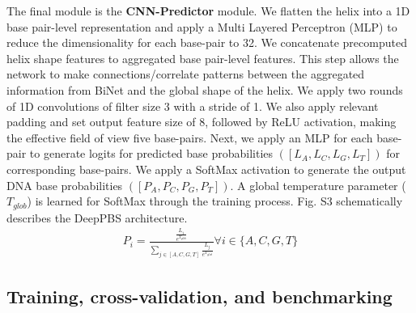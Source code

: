 The final module is the \textbf{CNN-Predictor} module. We flatten the helix into a 1D base pair-level representation and apply a Multi Layered Perceptron (MLP) to reduce the dimensionality for each base-pair to 32. We concatenate precomputed helix shape features to aggregated base pair-level features. This step allows the network to make connections/correlate patterns between the aggregated information from BiNet and the global shape of the helix. We apply two rounds of 1D convolutions of filter size 3 with a stride of 1. We also apply relevant padding and set output feature size of 8, followed by ReLU activation, making the effective field of view five base-pairs. Next, we apply an MLP for each base-pair to generate logits for predicted base probabilities $([L_A,L_C,L_G,L_T])$ for corresponding base-pairs. We apply a SoftMax \citep{Bridle1990} activation to generate the output DNA base probabilities $([P_A,P_C,P_G,P_T])$. A global temperature parameter ($T_{glob}$) is learned for SoftMax through the training process. Fig. S3 schematically describes the DeepPBS architecture.
\begin{align}
P_i = \frac{\frac{L_i}{e^{T_{glob}}}}{\sum\limits_{j\in[A,C,G,T]}\frac{L_j}{e^{T_{glob}}}} \forall i \in \{A,C,G,T\}
\end{align}
% 
\subsection{Training, cross-validation, and benchmarking}

